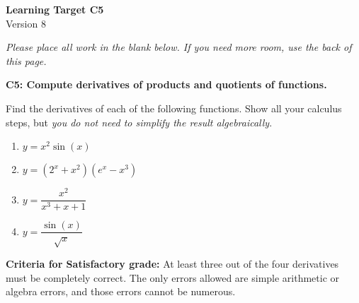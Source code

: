 \documentclass[10pt]{article}
\begin{document}
	\vspace*{0in}

		\begin{center}
			\textbf{Learning Target C5} \\
			{Version 8} \\ %
		\end{center}

\emph{Please place all work in the blank below. If you need more room, use the back of this page.}

\begin{framed}
	\textbf{C5: Compute derivatives of products and quotients of functions.}
\end{framed}

Find the derivatives of each of the following functions. Show all your calculus steps, but \emph{you do not need to simplify the result algebraically}. 

\begin{enumerate}
    \item $y = x^2 \sin(x)$
    \item $y = (2^x + x^2)(e^x - x^3)$
    \item $y = \dfrac{x^2}{x^3 + x + 1}$
    \item $y = \dfrac{\sin(x)}{\sqrt{x}}$
\end{enumerate}

\vfill


\begin{small}
    \begin{framed}
        	\textbf{Criteria for Satisfactory grade:} At least three out of the four derivatives must be completely correct. The only errors allowed are simple arithmetic or algebra errors, and those errors cannot be numerous.
    \end{framed}

\end{small}
\end{document}
